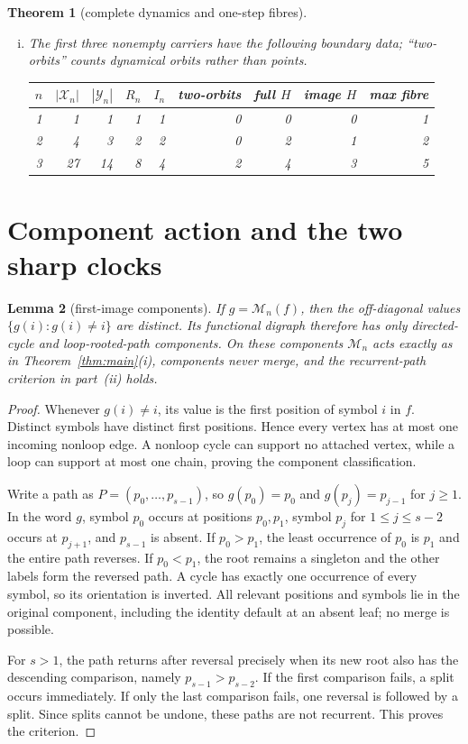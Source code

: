 \documentclass[a4paper,10pt]{amsart}
\newtheorem{theorem}{Theorem}
\newtheorem{lemma}[theorem]{Lemma}
\theoremstyle{remark}
\newcommand{\M}{\mathcal M}
\newcommand{\X}{\mathcal X}
\newcommand{\Y}{\mathcal Y}
\begin{document}
\begin{theorem}[complete dynamics and one-step fibres]
\begin{enumerate}[(i)]
\item The first three nonempty carriers have the following boundary data;
``two-orbits'' counts dynamical orbits rather than points.
\begin{center}
\begin{tabular}{c@{\quad}rrrrrrrr}
\toprule
$n$&$|\X_n|$&$|\Y_n|$&$R_n$&$I_n$&two-orbits&full $H$&image $H$&max fibre\\
\midrule
1&1&1&1&1&0&0&0&1\\
2&4&3&2&2&0&2&1&2\\
3&27&14&8&4&2&4&3&5\\
\bottomrule
\end{tabular}
\end{center}
\end{enumerate}
\end{theorem}

\section{Component action and the two sharp clocks}

\begin{lemma}[first-image components]\label{lem:components}
If $g=\M_n(f)$, then the off-diagonal values
$\{g(i):g(i)\ne i\}$ are distinct.  Its functional digraph therefore has
only directed-cycle and loop-rooted-path components.  On these components
$\M_n$ acts exactly as in Theorem~\ref{thm:main}(i), components never merge,
and the recurrent-path criterion in part~(ii) holds.
\end{lemma}

\begin{proof}
Whenever $g(i)\ne i$, its value is the first position of symbol $i$ in
$f$.  Distinct symbols have distinct first positions.  Hence every vertex
has at most one incoming nonloop edge.  A nonloop cycle can support no
attached vertex, while a loop can support at most one chain, proving the
component classification.

Write a path as $P=(p_0,\ldots,p_{s-1})$, so
$g(p_0)=p_0$ and $g(p_j)=p_{j-1}$ for $j\geq1$.  In the word $g$, symbol
$p_0$ occurs at positions $p_0,p_1$, symbol $p_j$ for
$1\leq j\leq s-2$ occurs at $p_{j+1}$, and $p_{s-1}$ is absent.  If
$p_0>p_1$, the least occurrence of $p_0$ is $p_1$ and the entire path
reverses.  If $p_0<p_1$, the root remains a singleton and the other labels
form the reversed path.  A cycle has exactly one occurrence of every
symbol, so its orientation is inverted.  All relevant positions and
symbols lie in the original component, including the identity default at
an absent leaf; no merge is possible.

For $s>1$, the path returns after reversal precisely when its new root also
has the descending comparison, namely $p_{s-1}>p_{s-2}$.  If the first
comparison fails, a split occurs immediately.  If only the last comparison
fails, one reversal is followed by a split.  Since splits cannot be undone,
these paths are not recurrent.  This proves the criterion.
\end{proof}
\end{document}
